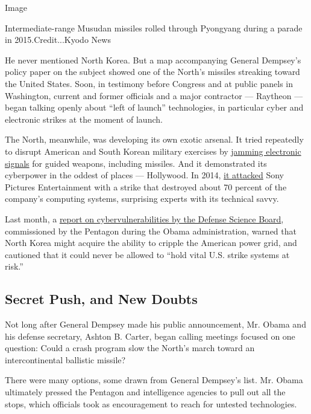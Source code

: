 Image

Intermediate-range Musudan missiles rolled through Pyongyang during a
parade in 2015.Credit...Kyodo News

He never mentioned North Korea. But a map accompanying General Dempsey's
policy paper on the subject showed one of the North's missiles streaking
toward the United States. Soon, in testimony before Congress and at
public panels in Washington, current and former officials and a major
contractor --- Raytheon --- began talking openly about ``left of
launch'' technologies, in particular cyber and electronic strikes at the
moment of launch.

The North, meanwhile, was developing its own exotic arsenal. It tried
repeatedly to disrupt American and South Korean military exercises by
\href{http://www.upi.com/North-Korea-jams-Souths-guided-missiles/49341299621609/}{jamming
electronic signals} for guided weapons, including missiles. And it
demonstrated its cyberpower in the oddest of places --- Hollywood. In
2014,
\href{https://www.nytimes3xbfgragh.onion/2014/12/18/world/asia/us-links-north-korea-to-sony-hacking.html?_r=0}{it
attacked} Sony Pictures Entertainment with a strike that destroyed about
70 percent of the company's computing systems, surprising experts with
its technical savvy.

Last month, a
\href{http://www.acq.osd.mil/dsb/reports/2010s/DSB-CyberDeterrenceReport_02-28-17_Final.pdf}{report
on cybervulnerabilities by the Defense Science Board}, commissioned by
the Pentagon during the Obama administration, warned that North Korea
might acquire the ability to cripple the American power grid, and
cautioned that it could never be allowed to ``hold vital U.S. strike
systems at risk.''

\hypertarget{secret-push-and-new-doubts}{%
\subsection{Secret Push, and New
Doubts}\label{secret-push-and-new-doubts}}

Not long after General Dempsey made his public announcement, Mr. Obama
and his defense secretary, Ashton B. Carter, began calling meetings
focused on one question: Could a crash program slow the North's march
toward an intercontinental ballistic missile?

There were many options, some drawn from General Dempsey's list. Mr.
Obama ultimately pressed the Pentagon and intelligence agencies to pull
out all the stops, which officials took as encouragement to reach for
untested technologies.

